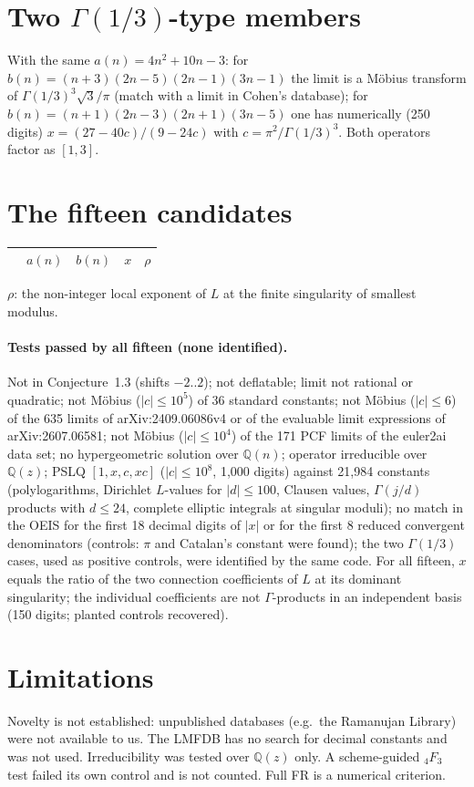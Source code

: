 \documentclass[11pt]{article}
\begin{document}
\section{Two \texorpdfstring{$\Gamma(1/3)$}{Gamma(1/3)}-type members}
With the same $a(n)=4n^2+10n-3$: for $b(n)=(n+3)(2n-5)(2n-1)(3n-1)$ the limit is a M\"obius transform of
$\Gamma(1/3)^3\sqrt3/\pi$ (match with a limit in Cohen's database); for $b(n)=(n+1)(2n-3)(2n+1)(3n-5)$ one has numerically
(250 digits) $x=(27-40c)/(9-24c)$ with $c=\pi^2/\Gamma(1/3)^3$. Both operators factor as $[1,3]$.

\section{The fifteen candidates}
{\small\begin{longtable}{lllll}\toprule
 & $a(n)$ & $b(n)$ & $x$ & $\rho$ \\\midrule
\bottomrule\end{longtable}}
$\rho$: the non-integer local exponent of $L$ at the finite singularity of smallest modulus.

\paragraph{Tests passed by all fifteen (none identified).} Not in Conjecture~1.3 (shifts $-2..2$); not deflatable; limit not rational
or quadratic; not M\"obius ($|c|\le10^5$) of 36 standard constants; not M\"obius ($|c|\le6$) of the 635 limits of arXiv:2409.06086v4
or of the evaluable limit expressions of arXiv:2607.06581; not M\"obius ($|c|\le10^4$) of the 171 PCF limits of the euler2ai data
set; no hypergeometric solution over $\mathbb Q(n)$; operator irreducible over $\mathbb Q(z)$; PSLQ $[1,x,c,xc]$ ($|c|\le10^8$,
1,000 digits) against 21,984 constants (polylogarithms, Dirichlet $L$-values for $|d|\le100$, Clausen values, $\Gamma(j/d)$
products with $d\le24$, complete elliptic integrals at singular moduli); no match in the OEIS for the first 18 decimal digits of $|x|$ or for the first 8
reduced convergent denominators (controls: $\pi$ and Catalan's constant were found); the two $\Gamma(1/3)$ cases, used as positive controls, were
identified by the same code. For all fifteen, $x$ equals the ratio of the two connection coefficients of $L$ at its dominant
singularity; the individual coefficients are not $\Gamma$-products in an independent basis (150 digits; planted controls recovered).

\section{Limitations}
Novelty is not established: unpublished databases (e.g.\ the Ramanujan Library) were not available to us. The LMFDB has no search for
decimal constants and was not used. Irreducibility was tested over $\mathbb Q(z)$ only. A scheme-guided ${}_4F_3$ test failed its own control and is not counted. Full FR is a numerical criterion.
\end{document}
